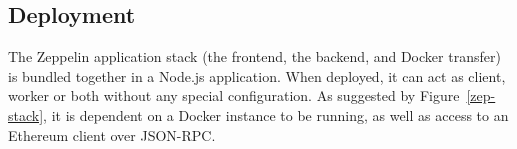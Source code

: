 
\subsection{Deployment}
The Zeppelin application stack (the frontend, the backend, and Docker transfer) is bundled together in a Node.js application. When deployed, it can act as client, worker or both without any special configuration. As suggested by Figure~\ref{zep-stack}, it is dependent on a Docker instance to be running, as well as access to an Ethereum client over JSON-RPC.

